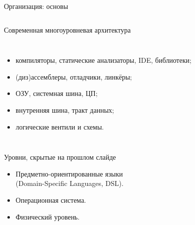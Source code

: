 \begin{frame}{Организация: основы}

\pause
\begin{columns}
	\column{6cm}
	\pause

	\column{6cm}
\end{columns}
\end{frame}

\begin{frame}{Современная многоуровневая архитектура}
\pause
\begin{columns}
	\column{6cm}

	\column{6.5cm}
\pause
\vspace{-.5cm}
\begin{itemize}[<+->]
	\item компиляторы, статические анализаторы,
			IDE, библиотеки;

	\vspace{.5cm}
	\item (диз)ассемблеры, отладчики, линкёры;

	\vspace{.6cm}
	\item ОЗУ, системная шина, ЦП;

	\vspace{1.5cm}
	\item внутренняя шина, тракт данных;

	\vspace{.9cm}
	\item логические вентили и схемы.
\end{itemize}
\end{columns}
\end{frame}

\begin{frame}{Уровни, скрытые на прошлом слайде}

\large
\begin{itemize}\itemsep=.5cm
    \item Предметно-ориентированные языки\\
    (Domain-Specific Languages, DSL).

    \item Операционная система.

    \item Физический уровень.
\end{itemize}

\end{frame}

